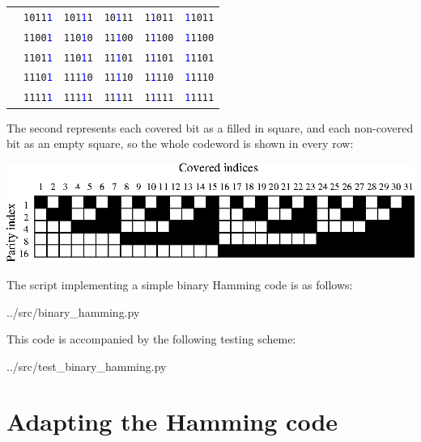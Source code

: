 \documentclass{article}
\begin{document}
\begin{center}
\begin{tabular}{l|rrrrr}
    & \texttt{1011\textcolor{blue}{1}} & \texttt{101\textcolor{blue}{1}1} & \texttt{10\textcolor{blue}{1}11} & \texttt{1\textcolor{blue}{1}011} & \texttt{\textcolor{blue}{1}1011} \\
    & \texttt{1100\textcolor{blue}{1}} & \texttt{110\textcolor{blue}{1}0} & \texttt{11\textcolor{blue}{1}00} & \texttt{1\textcolor{blue}{1}100} & \texttt{\textcolor{blue}{1}1100} \\
    & \texttt{1101\textcolor{blue}{1}} & \texttt{110\textcolor{blue}{1}1} & \texttt{11\textcolor{blue}{1}01} & \texttt{1\textcolor{blue}{1}101} & \texttt{\textcolor{blue}{1}1101} \\
    & \texttt{1110\textcolor{blue}{1}} & \texttt{111\textcolor{blue}{1}0} & \texttt{11\textcolor{blue}{1}10} & \texttt{1\textcolor{blue}{1}110} & \texttt{\textcolor{blue}{1}1110} \\
    & \texttt{1111\textcolor{blue}{1}} & \texttt{111\textcolor{blue}{1}1} & \texttt{11\textcolor{blue}{1}11} & \texttt{1\textcolor{blue}{1}111} & \texttt{\textcolor{blue}{1}1111} \\
    \bottomrule
    \end{tabular}
\end{center}

    The second represents each covered bit as a filled in square, and each
    non-covered bit as an empty square, so the whole codeword is shown in every
    row:

\begin{center}
\includegraphics{../psfiles/hamming_visualisation.eps}
\end{center}

    The script implementing a simple binary Hamming code is as follows:


{../src/binary_hamming.py}

    This code is accompanied by the following testing scheme:


{../src/test_binary_hamming.py}

    \section{Adapting the Hamming code}
\end{document}
